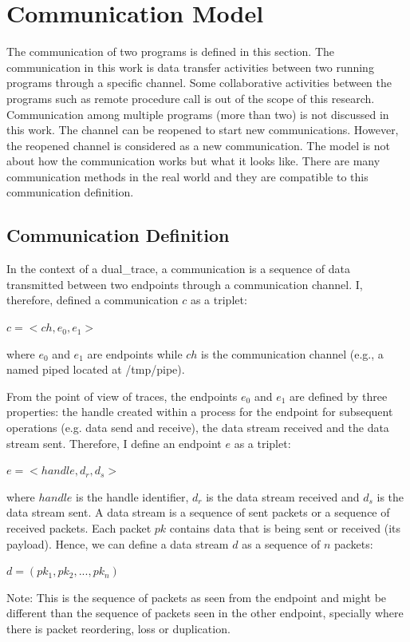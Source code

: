 \documentclass[12pt,oneside]{book}
\begin{document}
\section{Communication Model}\label{definition}
The communication of two programs is defined in this section. The communication in this work is data transfer activities between two running programs through a specific channel. Some collaborative activities between the programs such as remote procedure call is out of the scope of this research. Communication among multiple programs (more than two) is not discussed in this work. The channel can be reopened to start new communications. However, the reopened channel is considered as a new communication. The model is not about how the communication works but what it looks like. There are many communication methods in the real world and they are compatible to this communication definition. 

\subsection{Communication Definition}
In the context of a dual\_trace, a communication is a sequence of data transmitted between two endpoints through a communication channel. I, therefore, defined a communication $c$ as a triplet:

$c =<ch, e_0, e_1>$

where $e_0$ and $e_1$ are endpoints while $ch$ is the communication channel (e.g., a named piped located at /tmp/pipe).

From the point of view of traces, the endpoints $e_0$ and $e_1$ are defined by three properties: the handle created within a process for the endpoint for subsequent operations (e.g. data send and receive), the data stream received and the data stream sent. Therefore, I define an endpoint $e$ as a triplet:

$ e =<handle, d_r, d_s>$

where $handle$ is the handle identifier, $d_r$ is the data stream received and $d_s$ is the data stream sent. A data stream is a sequence of sent packets or a sequence of received packets. Each packet $pk$ contains data that is being sent or received (its payload). Hence, we can define a data stream $d$ as a sequence of $n$ packets:

$ d = (pk_1, pk_2, ..., pk_n)$ 

Note: This is the sequence of packets as seen from the endpoint and might be different than the sequence of packets seen in the other endpoint, specially where there is packet reordering, loss or duplication.
\end{document}
